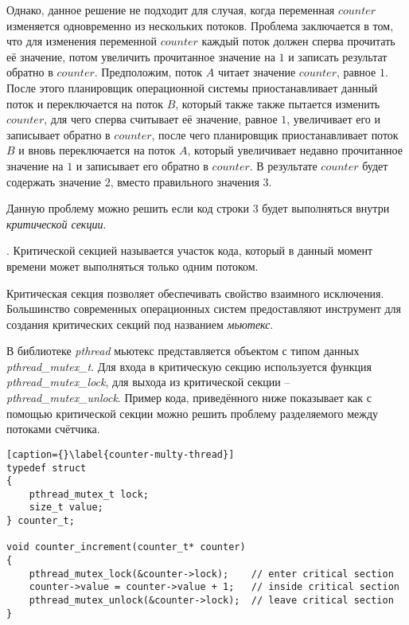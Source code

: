 Однако, данное решение не подходит для случая, когда переменная $counter$
изменяется одновременно из нескольких потоков. Проблема заключается в том, что
для изменения переменной $counter$ каждый поток должен сперва прочитать её
значение, потом увеличить прочитанное значение на $1$ и записать результат
обратно в $counter$. Предположим, поток $A$ читает значение $counter$, равное
$1$. После этого планировщик операционной системы приостанавливает данный поток
и переключается на поток $B$, который также также пытается изменить $counter$,
для чего сперва считывает её значение, равное $1$, увеличивает его и записывает
обратно в $counter$, после чего планировщик приостанавливает поток $B$ и вновь
переключается на поток $A$, который увеличивает недавно прочитанное значение на
$1$ и записывает его обратно в $counter$. В результате $counter$ будет содержать
значение $2$, вместо правильного значения $3$.

Данную проблему можно решить если код строки $3$ будет выполняться внутри
\textit{критической секции}.

\begin{definition}. Критической секцией называется участок кода,
который в данный момент времени может выполняться только одним потоком.
\end{definition}

Критическая секция позволяет обеспечивать свойство взаимного исключения.
Большинство современных операционных систем предоставляют инструмент для
создания критических секций под названием \textit{мьютекс}.

В библиотеке \textit{pthread} мьютекс представляется объектом с типом данных
\textit{pthread\_mutex\_t}. Для входа в критическую секцию используется функция
\textit{pthread\_mutex\_lock}, для выхода из критической секции --
\textit{pthread\_mutex\_unlock}. Пример кода, приведённого ниже показывает как
с помощью критической секции можно решить проблему разделяемого между потоками
счётчика.

\begin{lstlisting}[caption={}\label{counter-multy-thread}]
typedef struct
{
    pthread_mutex_t lock;
    size_t value;
} counter_t;

void counter_increment(counter_t* counter)
{
    pthread_mutex_lock(&counter->lock);    // enter critical section
    counter->value = counter->value + 1;   // inside critical section
    pthread_mutex_unlock(&counter->lock);  // leave critical section
}
\end{lstlisting}

